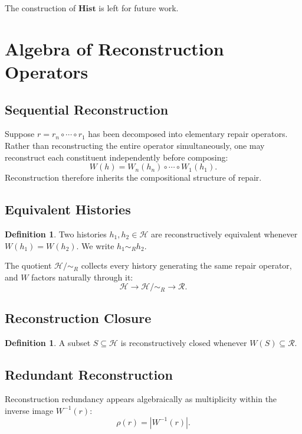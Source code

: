 \documentclass[12pt,oneside]{article}
\theoremstyle{plain}
\theoremstyle{definition}
\newtheorem{definition}[theorem]{Definition}
\theoremstyle{remark}
\theoremstyle{plain}
\newcommand{\Hist}{\mathcal{H}}
\begin{document}
The construction of $\mathbf{Hist}$ is left for future work.

\section{Algebra of Reconstruction Operators}

\subsection{Sequential Reconstruction}

Suppose $r = r_n \circ \cdots \circ r_1$ has been decomposed into elementary repair operators.
Rather than reconstructing the entire operator simultaneously, one may reconstruct each constituent
independently before composing:
\[
W(h) = W_n(h_n) \circ \cdots \circ W_1(h_1).
\]
Reconstruction therefore inherits the compositional structure of repair.

\subsection{Equivalent Histories}

\begin{definition}
Two histories $h_1, h_2 \in \Hist$ are reconstructively equivalent whenever $W(h_1) = W(h_2)$.
We write $h_1 \sim_R h_2$.
\end{definition}

The quotient $\Hist / {\sim_R}$ collects every history generating the same repair operator, and
$W$ factors naturally through it:
\[
\Hist \longrightarrow \Hist / {\sim_R} \longrightarrow \mathcal{R}.
\]

\subsection{Reconstruction Closure}

\begin{definition}
A subset $S \subseteq \Hist$ is reconstructively closed whenever $W(S) \subseteq \mathcal{R}$.
\end{definition}

\subsection{Redundant Reconstruction}

Reconstruction redundancy appears algebraically as multiplicity within the inverse image
$W^{-1}(r)$:
\[
\rho(r) = |W^{-1}(r)|.
\]
\end{document}
